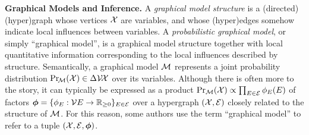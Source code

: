 \documentclass[twoside]{article}
\begin{document}
\textbf{Graphical Models and Inference.}
A \emph{graphical model structure}
is a (directed) (hyper)graph whose vertices $\mathcal X$ are variables, and whose (hyper)edges somehow indicate local influences between variables.
A \emph{probabilistic graphical model},
or simply  ``graphical model'',
is a
graphical model structure
together with local quantitative information corresponding to the local influences described by structure.
%
Semantically,
a graphical model $\cal M$
represents a joint probability distribution $\Pr_{\!\cal M}(\mathcal X) \in \Delta \mathcal V\!\mathcal X$ over its variables.
Although there is often more to the story,
it can typically be
expressed as a product
$\Pr_{\cal M}(\mathcal X) \propto \prod_{E \in \mathcal E} \phi_{E}(E)$
of factors
$\boldsymbol\phi = 
\{ \phi_E : \mathcal V E \to \mathbb R_{\ge 0} \}_{E \in \mathcal E}$
over a hypergraph $(\mathcal X, \mathcal E)$ closely related to the structure of $\cal M$.
For this reason, some authors use the term ``graphical model'' to refer to a tuple $(\mathcal X ,\mathcal E, \boldsymbol\phi)$.
\end{document}
